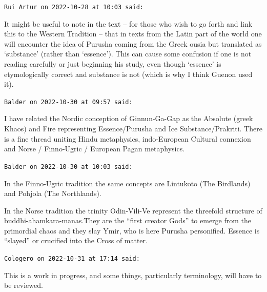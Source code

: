\begin{footnotesize}\begin{sffamily}

\texttt{Rui Artur on 2022-10-28 at 10:03 said: }

It might be useful to note in the text – for those who wish to go forth and link this to the Western Tradition – that in texts from the Latin part of the world one will encounter the idea of Purusha coming from the Greek ousia but translated as ‘substance’ (rather than ‘essence’). This can cause some confusion if one is not reading carefully or just beginning his study, even though ‘essence’ is etymologically correct and substance is not (which is why I think Guenon used it).

\hfill

\texttt{Balder on 2022-10-30 at 09:57 said: }

I have related the Nordic conception of Ginnun-Ga-Gap as the Absolute (greek Khaos) and Fire representing Essence/Purusha and Ice Substance/Prakriti. There is a fine thread uniting Hindu metaphysics, indo-European Cultural connexion and Norse / Finno-Ugric / European Pagan metaphysics.

\hfill

\texttt{Balder on 2022-10-30 at 10:03 said: }

In the Finno-Ugric tradition the same concepts are Lintukoto (The Birdlands) and Pohjola (The Northlands).

In the Norse tradition the trinity Odin-Vili-Ve represent the threefold structure of buddhi-ahamkara-manas.They are the “first creator Gods” to emerge from the primordial chaos and they slay Ymir, who is here Purusha personified. Essence is “slayed” or crucified into the Cross of matter.

\hfill

\texttt{Cologero on 2022-10-31 at 17:14 said: }

This is a work in progress, and some things, particularly terminology, will have to be reviewed.

\hfill

\end{sffamily}\end{footnotesize}